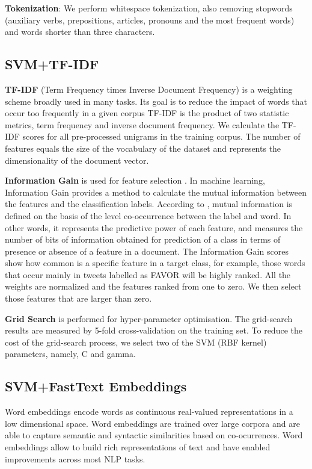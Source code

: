 \documentclass[10pt, a4paper]{article}
\begin{document}
\textbf{Tokenization}: We perform whitespace tokenization, also removing stopwords (auxiliary verbs, prepositions, articles, pronouns and the most frequent words) and words shorter than three characters.

\subsection{SVM+TF-IDF}\label{sec:tf-idf+svm}

\textbf{TF-IDF} (Term Frequency times Inverse Document Frequency) \cite{Jones72astatistical} is a weighting scheme broadly used in many tasks. Its goal is to reduce the impact of words that occur too frequently in a given corpus TF-IDF is the product of two statistic metrics, term frequency and inverse document frequency.
We calculate the TF-IDF scores for all pre-processed unigrams in the training corpus. The number of features equals the size of the vocabulary of the dataset and represents the dimensionality of the document vector.

\textbf{Information Gain} is used for feature selection \cite{Cover:2006:EIT:1146355}. In machine learning, Information Gain provides a method to calculate the mutual information between the features and the classification labels. According to \cite{Aggarwal12}, mutual information is defined on the basis of the level co-occurrence between the label and word. In other words, it represents the predictive power of each feature, and measures the number of bits of information obtained for prediction of a class in terms of presence or absence of a feature in a document. The Information Gain scores show how common is a specific feature in a target class, for example, those words that occur mainly in tweets labelled as FAVOR will be highly ranked. All the weights are normalized and the features ranked from one to zero. We then select those features that are larger than zero.

\textbf{Grid Search} is performed for hyper-parameter optimisation. The grid-search results are measured by 5-fold cross-validation on the training set. To reduce the cost of the grid-search process, we select two of the SVM (RBF kernel) parameters, namely, C and gamma.

\subsection{SVM+FastText Embeddings}\label{sec:svm+f-embedd}

Word embeddings encode words as continuous real-valued representations in a low dimensional space. Word embeddings are trained over large corpora and are able to capture semantic and syntactic similarities based on co-ocurrences. Word embeddings allow to build rich representations of text and have enabled improvements across most NLP tasks.
\end{document}
